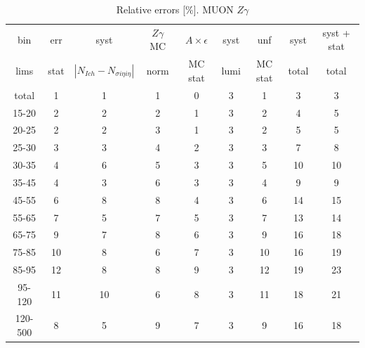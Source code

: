 \begin{table}[h]
  \scriptsize
  \begin{center}
  \caption{Relative errors [\%]. MUON $Z\gamma$}
  \begin{tabular}{|c|c|c|c|c|c|c|c|c|}
    bin  & err & syst & $Z\gamma$ MC & $A \times \epsilon$ & syst & unf & syst & syst + stat\\
    lims  & stat & $|N_{Ich}-N_{\sigma{i\eta i\eta}}|$ & norm & MC stat & lumi & MC stat & total & total\\ \hline
    total  & 1 & 1 & 1 & 0 & 3 & 1 & 3 & 3 \\ \hline
    15-20 & 2 & 2 & 2 & 1 & 3 & 2 & 4 & 5 \\ \hline
    20-25 & 2 & 2 & 3 & 1 & 3 & 2 & 5 & 5 \\ \hline
    25-30 & 3 & 3 & 4 & 2 & 3 & 3 & 7 & 8 \\ \hline
    30-35 & 4 & 6 & 5 & 3 & 3 & 5 & 10 & 10 \\ \hline
    35-45 & 4 & 3 & 6 & 3 & 3 & 4 & 9 & 9 \\ \hline
    45-55 & 6 & 8 & 8 & 4 & 3 & 6 & 14 & 15 \\ \hline
    55-65 & 7 & 5 & 7 & 5 & 3 & 7 & 13 & 14 \\ \hline
    65-75 & 9 & 7 & 8 & 6 & 3 & 9 & 16 & 18 \\ \hline
    75-85 & 10 & 8 & 6 & 7 & 3 & 10 & 16 & 19 \\ \hline
    85-95 & 12 & 8 & 8 & 9 & 3 & 12 & 19 & 23 \\ \hline
    95-120 & 11 & 10 & 6 & 8 & 3 & 11 & 18 & 21 \\ \hline
    120-500 & 8 & 5 & 9 & 7 & 3 & 9 & 16 & 18 \\ \hline
  \end{tabular}
  \label{tab:systInPercent_MUON_ZGamma}
  \end{center}
\end{table}

